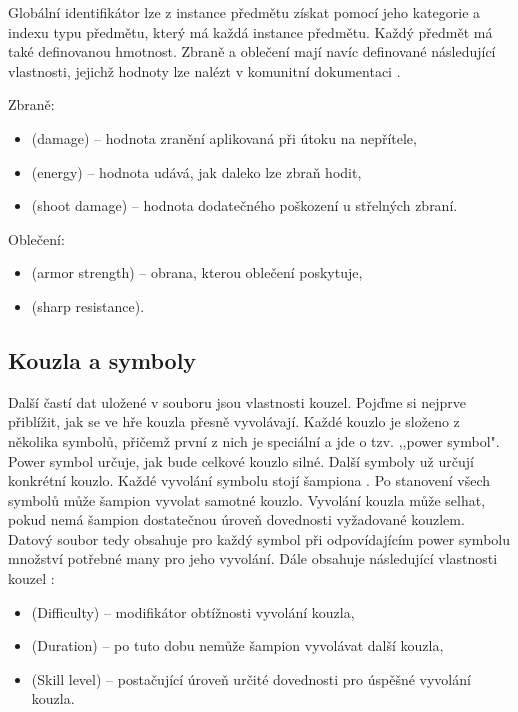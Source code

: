 Globální identifikátor lze z instance předmětu získat pomocí jeho kategorie a indexu typu předmětu,
který má každá instance předmětu. Každý předmět má také definovanou hmotnost. Zbraně a oblečení mají navíc
definované následující vlastnosti, jejichž hodnoty lze nalézt v komunitní dokumentaci \cite{DMItems}.

\medskip

Zbraně:
\begin{itemize}
\item {} (damage) -- hodnota zranění aplikovaná při útoku na nepřítele,
\item {} (energy) -- hodnota udává, jak daleko lze zbraň hodit,
\item {} (shoot damage) -- hodnota dodatečného poškození u střelných zbraní.
\end{itemize}

Oblečení:
\begin{itemize}
\item {} (armor strength) -- obrana, kterou oblečení poskytuje, 
\item {} (sharp resistance). 
\end{itemize}

\subsection{Kouzla a symboly}\label{magic-symbols}

Další častí dat uložené v souboru  jsou vlastnosti kouzel. Pojď\-me si nejprve přiblížit,
jak se ve hře kouzla přesně vyvolávají. Každé kouzlo je složeno z několika symbolů, přičemž první 
z nich je speciální a jde o tzv. ,,power symbol". Power symbol určuje, jak bude celkové kouzlo silné.
Další symboly už určují konkrétní kouzlo. Každé vyvolání symbolu stojí šampiona . Po stanovení 
všech symbolů může šampion vyvolat samotné kouzlo. Vyvolání kouzla může selhat, pokud nemá šampion 
dostatečnou úroveň dovednosti vyžadované kouzlem. Datový soubor tedy obsahuje pro každý symbol při odpovídajícím
power symbolu množství potřebné many pro jeho vyvolání. Dále obsahuje následující vlastnosti kouzel \cite{DMSpells}:

\begin{itemize}
\item {} (Difficulty) -- modifikátor obtížnosti vyvolání kouzla,
\item {} (Duration) -- po tuto dobu nemůže šampion vyvolávat další kouzla,
\item {} (Skill level) -- postačující úroveň určité dovednosti pro úspěšné vyvolání kouzla.
\end{itemize}

